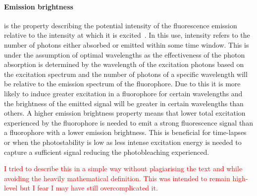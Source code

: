 \paragraph{Emission brightness} is the property describing the potential intensity of the fluorescence emission relative to the intensity at which it is excited~\cite{fluorophore_article, fluorophorePick}. In this use, intensity refers to the number of photons either absorbed or emitted within some time window. This is under the assumption of optimal wavelengths as the effectiveness of the photon absorption is determined by the wavelength of the excitation photons based on the excitation spectrum and the number of photons of a specific wavelength will be relative to the emission spectrum of the fluorophore. Due to this it is more likely to induce greater excitation in a fluorophore for certain wavelengths and the brightness of the emitted signal will be greater in certain wavelengths than others. A higher emission brightness property means that lower total excitation experienced by the fluorophore is needed to emit a strong fluorescence signal than a fluorophore with a lower emission brightness. This is beneficial for time-lapses or when the photostability is low as less intense excitation energy is needed to capture a sufficient signal reducing the photobleaching experienced.\par
\textcolor{red}{I tried to describe this in a simple way without plagiarising the text and while avoiding the heavily mathematical definition. This was intended to remain high-level but I fear I may have still overcomplicated it.}


